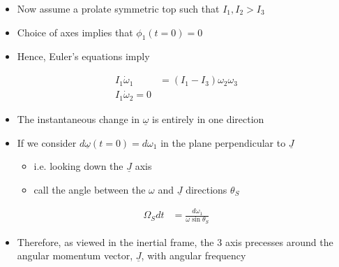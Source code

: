 \documentclass[a4paper,11pt,normalem]{article}
\begin{document}
\begin{example}
\begin{itemize}
\item
  Now assume a prolate symmetric top such that \(I_1, I_2 > I_3\)
\item
  Choice of axes implies that \(\phi_1(t = 0) = 0\)
\item
  Hence, Euler's equations imply
\end{itemize}

\[
    \begin{aligned}
    I_1\dot{\omega}_1 &= (I_1 - I_3)\omega_2\omega_3 \\
    I_1\dot{\omega}_2 = 0
    \end{aligned}
\]

\begin{itemize}
\item
  The instantaneous change in \(\underline{\omega}\) is entirely in one
  direction
\item
  If we consider \(d\underline{\omega}(t = 0) = d\omega_1\) in the plane
  perpendicular to \(\underline{J}\)

  \begin{itemize}

  \item
    i.e. looking down the \(\underline{J}\) axis
  \item
    call the angle between the \(\omega\) and \(\underline{J}\)
    directions \(\theta_S\)
  \end{itemize}
\end{itemize}

\[
    \begin{aligned}
    \Omega_Sdt &= \frac{d\omega_1}{\omega\sin\theta_S}
    \end{aligned}
\]

\begin{itemize}
\item
  Therefore, as viewed in the inertial frame, the 3 axis precesses
  around the angular momentum vector, \(\underline{J}\), with angular
  frequency
\end{itemize}


\end{example}
\end{document}
